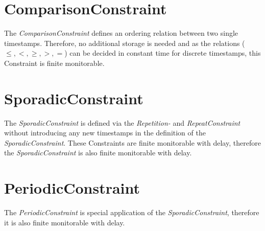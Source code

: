 \section{ComparisonConstraint}
	The \emph{ComparisonConstraint} defines an ordering relation between two single timestamps. Therefore, no additional storage is needed and as the relations ($\leq, <, \geq, >, =$) can be decided in constant time for discrete timestamps, this Constraint is finite monitorable.
	
\section{SporadicConstraint}
	The \emph{SporadicConstraint} is defined via the \emph{Repetition-} and \emph{RepeatConstraint} without introducing any new timestamps in the definition of the \emph{SporadicConstraint}. These Constraints are finite monitorable with delay, therefore the \emph{SporadicConstraint} is also finite monitorable with delay.
	
\section{PeriodicConstraint}
	The \emph{PeriodicConstraint} is special application of the \emph{SporadicConstraint}, therefore it is also finite monitorable with delay.
	

